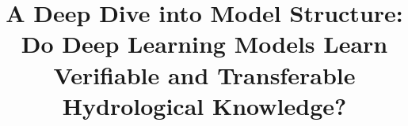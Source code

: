 \documentclass{article}
\title{A Deep Dive into Model Structure: Do Deep Learning Models Learn Verifiable and Transferable Hydrological Knowledge?}
\author{}
\begin{document}
\date{}
\maketitle













\end{document}
